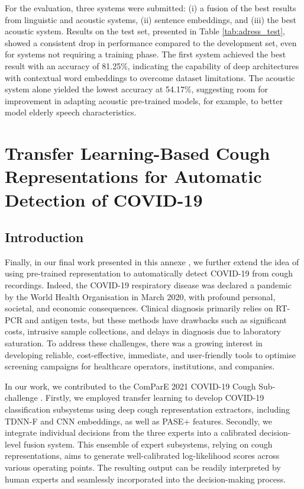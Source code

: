   For the evaluation, three systems were submitted: (i) a fusion of the best results from linguistic and acoustic systems, (ii) sentence embeddings, and (iii) the best acoustic system. Results on the test set, presented in Table \ref{tab:adress_test}, showed a consistent drop in performance compared to the development set, even for systems not requiring a training phase. The first system achieved the best result with an accuracy of 81.25\%, indicating the capability of deep architectures with contextual word embeddings to overcome dataset limitations. The acoustic system alone yielded the lowest accuracy at 54.17\%, suggesting room for improvement in adapting acoustic pre-trained models, for example, to better model elderly speech characteristics.



\section{Transfer Learning-Based Cough Representations for Automatic Detection of COVID-19}
\subsection{Introduction}
Finally, in our final work presented in this annexe \cite{SoleraUrea2021TransferLC}, we further extend the idea of using pre-trained representation to automatically detect COVID-19 from cough recordings. Indeed, the COVID-19 respiratory disease was declared a pandemic by the World Health Organisation in March 2020, with profound personal, societal, and economic consequences. Clinical diagnosis primarily relies on RT-PCR and antigen tests, but these methods have drawbacks such as significant costs, intrusive sample collections, and delays in diagnosis due to laboratory saturation. To address these challenges, there was a growing interest in developing reliable, cost-effective, immediate, and user-friendly tools to optimise screening campaigns for healthcare operators, institutions, and companies.

In our work, we contributed to the ComParE 2021 COVID-19 Cough Sub-challenge \cite{schuller21_interspeech}. Firstly, we employed transfer learning to develop COVID-19 classification subsystems using deep cough representation extractors, including \ac{TDNN-F} and \ac{CNN} embeddings, as well as \ac{PASE}+ features. Secondly, we integrate individual decisions from the three experts into a calibrated decision-level fusion system. This ensemble of expert subsystems, relying on cough representations, aims to generate well-calibrated log-likelihood scores across various operating points. The resulting output can be readily interpreted by human experts and seamlessly incorporated into the decision-making process.

